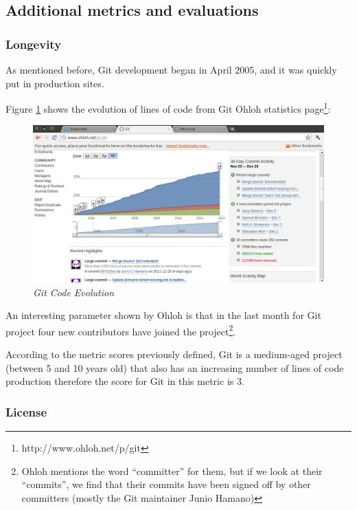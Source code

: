 \documentclass[a4paper,10pt]{article}
\begin{document}
\subsection{Additional metrics and evaluations}


\subsubsection{Longevity}
As mentioned before, Git development began in April 2005, and it was quickly
put in production sites. 

Figure \ref{figure:gitcodeevolution2} shows the evolution of lines of code
from Git Ohloh statistics page\footnote{http://www.ohloh.net/p/git}:

\begin{figure}[H]
    \centering
    \includegraphics[width=15cm, keepaspectratio]{img/GITohloh.jpg}
    \caption{\textit{Git Code Evolution}}
    \label{figure:gitcodeevolution2}
 \end{figure}

An interesting parameter shown by Ohloh is that in the last month for Git
project four new contributors have joined the project\footnote{Ohloh mentions
the word ``committer'' for them, but if we look at their ``commits'', we find
that their commits have been signed off by other committers (mostly the Git
maintainer Junio Hamano)}.

According to the metric scores previously defined, Git is a medium-aged project
(between 5 and 10 years old) that also has an increasing number of lines of code
production therefore the score for Git in this metric is 3.

\subsubsection{License}
\end{document}
